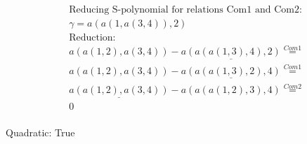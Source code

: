\documentclass[11pt]{amsart}
\begin{document}
\begin{align*} 
& \text{Reducing S-polynomial for relations Com1 and Com2:} \\ 
& \gamma = a(a(1,a(3,4)),2) \\ 
& \text{Reduction}: \\&a(a(1,2),a(3,4)) - \underline{a(a(a(1,3),4),2)} \stackrel{ Com1 }{=}  \\ 
&a(a(1,2),a(3,4)) - \underline{a(a(a(1,3),2),4)} \stackrel{ Com1 }{=}  \\ 
&\underline{a(a(1,2),a(3,4))} - a(a(a(1,2),3),4) \stackrel{ Com2 }{=}  \\ 
&0\\ 
\end{align*} 
 

 Quadratic: True
 
\end{document}
